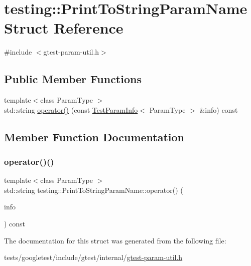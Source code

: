 \hypertarget{structtesting_1_1PrintToStringParamName}{}\section{testing\+:\+:Print\+To\+String\+Param\+Name Struct Reference}
\label{structtesting_1_1PrintToStringParamName}


{\ttfamily \#include $<$gtest-\/param-\/util.\+h$>$}

\subsection*{Public Member Functions}
\begin{DoxyCompactItemize}
\item 
{\footnotesize template$<$class Param\+Type $>$ }\\std\+::string \hyperlink{structtesting_1_1PrintToStringParamName_a05b411cfb75dadb2c3c0355aee1dcf21}{operator()} (const \hyperlink{structtesting_1_1TestParamInfo}{Test\+Param\+Info}$<$ Param\+Type $>$ \&info) const
\end{DoxyCompactItemize}


\subsection{Member Function Documentation}
\mbox{\label{structtesting_1_1PrintToStringParamName_a05b411cfb75dadb2c3c0355aee1dcf21}} 
\subsubsection{\texorpdfstring{operator()()}{operator()()}}
{\footnotesize\ttfamily template$<$class Param\+Type $>$ \\
std\+::string testing\+::\+Print\+To\+String\+Param\+Name\+::operator() (\begin{DoxyParamCaption}\item[{const \hyperlink{structtesting_1_1TestParamInfo}{Test\+Param\+Info}$<$ Param\+Type $>$ \&}]{info }\end{DoxyParamCaption}) const\hspace{0.3cm}{\ttfamily [inline]}}



The documentation for this struct was generated from the following file\+:\begin{DoxyCompactItemize}
\item 
tests/googletest/include/gtest/internal/\hyperlink{gtest-param-util_8h}{gtest-\/param-\/util.\+h}\end{DoxyCompactItemize}
